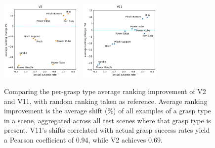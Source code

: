 \begin{figure}[h]
\begin{center}
\includegraphics[width=0.35\textwidth]{images/post-analysis/V2_suc_rate_vs_improvement.png}~
\includegraphics[width=0.35\textwidth]{images/post-analysis/V11_suc_rate_vs_improvement.png}
\caption{Comparing the per-grasp type average ranking improvement of V2 and V11, with random ranking taken as reference. Average ranking improvement is the average shift (\%) of all examples of a grasp type in a scene, aggregated across all test scenes where that grasp type is present. V11's shifts correlated with actual grasp success rates yield a Pearson coefficient of 0.94, while V2 achieves 0.69. \label{fig:v2_vs_v11_rates}}
\end{center}
\end{figure}

